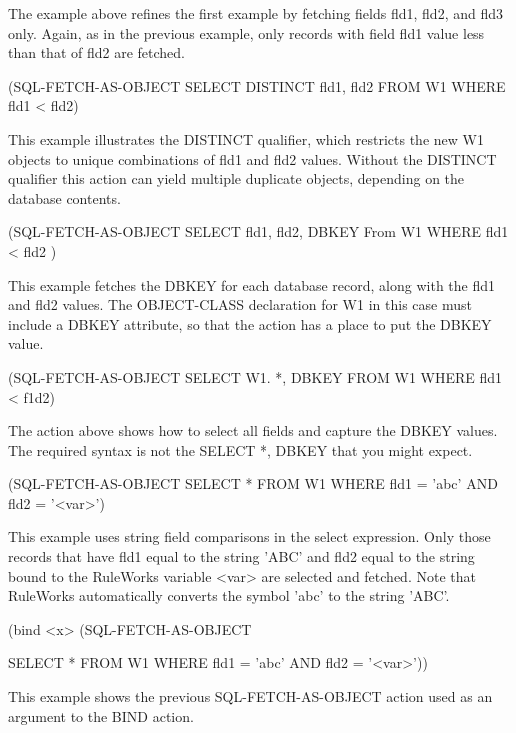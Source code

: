 {{The example above refines the first example by fetching
fields fld1, fld2, and fld3 only. Again, as in the previous
example, only records with field fld1 value less than that of
fld2 are fetched.



(SQL-FETCH-AS-OBJECT SELECT DISTINCT fld1, fld2 FROM W1 WHERE
fld1 < fld2)







This example illustrates the DISTINCT qualifier, which
restricts the new W1 objects to unique combinations of fld1
and fld2 values. Without the DISTINCT qualifier this action
can yield multiple duplicate objects, depending on the
database contents.



(SQL-FETCH-AS-OBJECT SELECT fld1, fld2, DBKEY From W1 WHERE
fld1 < fld2 )



This example fetches the DBKEY for each database record,
along with the fld1 and fld2 values. The OBJECT-CLASS
declaration for W1 in this case must include a DBKEY
attribute, so that the action has a place to put the DBKEY
value.



(SQL-FETCH-AS-OBJECT SELECT W1. *, DBKEY FROM W1 WHERE fld1 <
f1d2)



The action above shows how to select all fields and capture
the DBKEY values. The required syntax is not the SELECT *,
DBKEY that you might expect.



(SQL-FETCH-AS-OBJECT SELECT * FROM W1 WHERE fld1 = 'abc' AND
fld2 = '<var>')



This example uses string field comparisons in the select
expression. Only those records that have fld1 equal to the
string 'ABC' and fld2 equal to the string bound to the
RuleWorks variable <var> are selected and fetched. Note that
RuleWorks automatically converts the symbol 'abc' to the
string 'ABC'.



(bind <x> (SQL-FETCH-AS-OBJECT

SELECT * FROM W1 WHERE fld1 = 'abc' AND fld2 = '<var>'))



This example shows the previous SQL-FETCH-AS-OBJECT action
used as an argument to the BIND action.

}}
